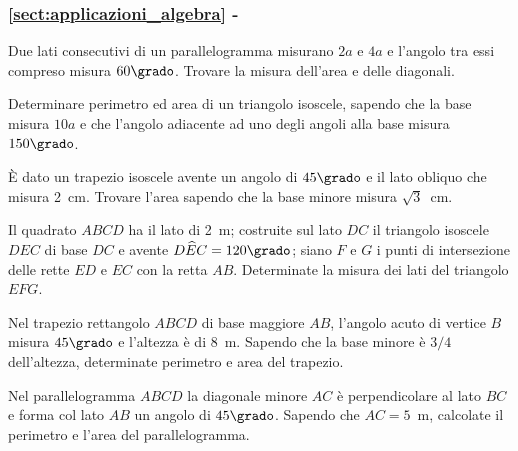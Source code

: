 \begingroup
\hypersetup{linkcolor=black}
\subsubsection*{\ref{sect:applicazioni_algebra} - 
}
\endgroup

\begin{multicols}{2}


\begin{esercizio}
\label{ese:7.16}
Due lati consecutivi di un parallelogramma misurano $2a$ e $4a$ e 
l'angolo tra essi compreso misura $60\grado$. Trovare la misura 
dell'area e delle diagonali.
\end{esercizio}

\begin{esercizio}
\label{ese:7.18}
Determinare perimetro ed area di un triangolo isoscele, sapendo che 
la base misura $10a$ e che l'angolo adiacente ad uno degli angoli 
alla base misura $150\grado$.
\end{esercizio}


\begin{esercizio}
\label{ese:7.21}
\`E dato un trapezio isoscele avente un angolo di $45\grado$ e il 
lato obliquo che misura 2~cm. Trovare l'area sapendo che la base 
minore misura $\sqrt{3}$~cm.
\end{esercizio}

\begin{esercizio}
\label{ese:7.23}
Il quadrato $ABCD$ ha il lato di 2~m; costruite sul lato $DC$ il 
triangolo isoscele $DEC$ di base $DC$ e avente 
$D\widehat{E}C=120\grado$; siano $F$ e $G$ i punti di intersezione 
delle rette $ED$ e $EC$ con la retta $AB$. Determinate la misura dei 
lati del triangolo $EFG$.
\end{esercizio}


\begin{esercizio}
\label{ese:7.26}
Nel trapezio rettangolo $ABCD$ di base maggiore $AB$, l'angolo acuto 
di vertice $B$ misura $45\grado$ e l'altezza è di 8~m. Sapendo che la 
base minore è $3/4$ dell'altezza, determinate perimetro e area del 
trapezio.
\end{esercizio}

\begin{esercizio}
\label{ese:7.27}
Nel parallelogramma $ABCD$ la diagonale minore $AC$ è perpendicolare 
al lato $BC$ e forma col lato $AB$ un angolo di $45\grado$. Sapendo 
che $AC=5$~m, calcolate il perimetro e l'area del parallelogramma.
\end{esercizio}


\end{multicols}
